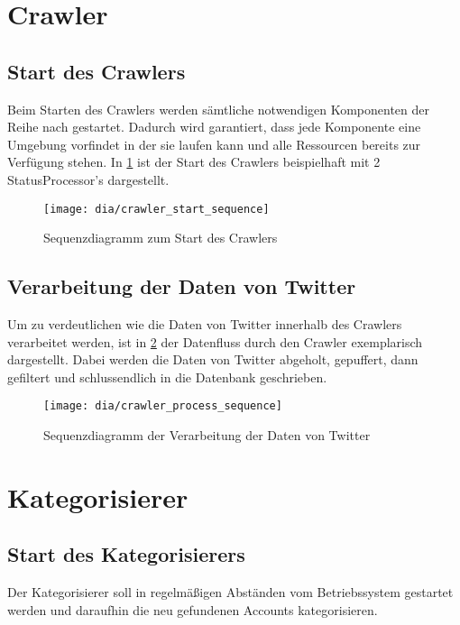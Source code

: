 \section{Crawler}
\subsection{Start des Crawlers}
Beim Starten des Crawlers werden sämtliche notwendigen Komponenten der Reihe nach gestartet. Dadurch wird garantiert, dass jede Komponente eine Umgebung vorfindet in der sie laufen kann und alle Ressourcen bereits zur Verfügung stehen. In \cref{fig:crawler_start} ist der Start des Crawlers beispielhaft mit 2 StatusProcessor's dargestellt.
\begin{figure}[h!]
	\centering
	\texttt{[image: dia/crawler\_start\_sequence]}
	\caption{Sequenzdiagramm zum Start des Crawlers}
	\label{fig:crawler_start}
\end{figure}

\subsection{Verarbeitung der Daten von Twitter}
Um zu verdeutlichen wie die Daten von Twitter innerhalb des Crawlers verarbeitet werden, ist in \cref{fig:crawler_process} der Datenfluss durch den Crawler exemplarisch dargestellt. Dabei werden die Daten von Twitter abgeholt, gepuffert, dann gefiltert und schlussendlich in die Datenbank geschrieben.
\begin{figure}[h!]
	\centering
	\texttt{[image: dia/crawler\_process\_sequence]}
	\caption{Sequenzdiagramm der Verarbeitung der Daten von Twitter}
	\label{fig:crawler_process}
\end{figure}

\section{Kategorisierer}

\subsection{Start des Kategorisierers}
Der Kategorisierer soll in regelmäßigen Abständen vom Betriebssystem gestartet werden und daraufhin die neu gefundenen Accounts kategorisieren.

